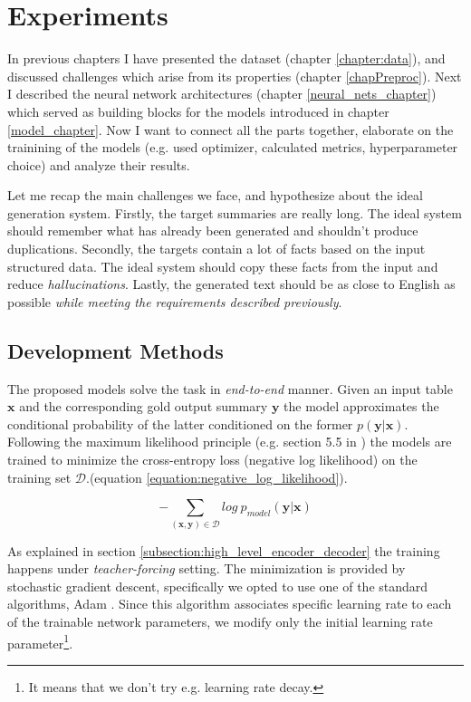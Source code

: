 \chapter{Experiments} \label{experiments_chapter}

In previous chapters I have presented the dataset (chapter \ref{chapter:data}), and discussed challenges which arise from its properties (chapter \ref{chapPreproc}). Next I described the neural network architectures (chapter \ref{neural_nets_chapter}) which served as building blocks for the models introduced in chapter \ref{model_chapter}. Now I want to connect all the parts together, elaborate on the trainining of the models (e.g. used optimizer, calculated metrics, hyperparameter choice) and analyze their results.

Let me recap the main challenges we face, and hypothesize about the ideal generation system. Firstly, the target summaries are really long. The ideal system should remember what has already been generated and shouldn't produce duplications. Secondly, the targets contain a lot of facts based on the input structured data. The ideal system should copy these facts from the input and reduce \emph{hallucinations}. Lastly, the generated text should be as close to English as possible \emph{while meeting the requirements described previously}.

\section{Development Methods}

The proposed models solve the task in \emph{end-to-end} manner. Given an input table $\boldsymbol{x}$ and the corresponding gold output summary $\boldsymbol{y}$ the model approximates the conditional probability of the latter conditioned on the former $p(\boldsymbol{y} | \boldsymbol{x})$. Following the maximum likelihood principle (e.g. section 5.5 in \citep{Goodfellow-et-al-2016}) the models are trained to minimize the cross-entropy loss (negative log likelihood) on the training set $\mathcal{D}$.(equation \ref{equation:negative_log_likelihood}).

\begin{equation} \label{equation:negative_log_likelihood}
    - \sum_{(\boldsymbol{x}, \boldsymbol{y}) \in \mathcal{D}}{log\ p_{model}(\boldsymbol{y} | \boldsymbol{x})}
\end{equation}

As explained in section \ref{subsection:high_level_encoder_decoder} the training happens under \emph{teacher-forcing} setting. The minimization is provided by stochastic gradient descent, specifically we opted to use one of the standard algorithms, Adam \citep{kingma2014adam}. Since this algorithm associates specific learning rate to each of the trainable network parameters, we modify only the initial learning rate parameter\footnote{It means that we don't try e.g. learning rate decay.}.

